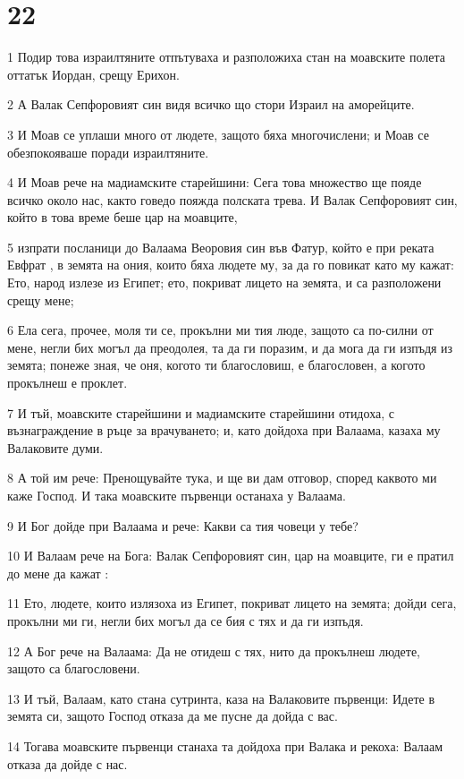 \chapter{22}

\par 1 Подир това израилтяните отпътуваха и разположиха стан на моавските полета оттатък Иордан, срещу Ерихон.
\par 2 А Валак Сепфоровият син видя всичко що стори Израил на аморейците.
\par 3 И Моав се уплаши много от людете, защото бяха многочислени; и Моав се обезпокояваше поради израилтяните.
\par 4 И Моав рече на мадиамските старейшини: Сега това множество ще пояде всичко около нас, както говедо пояжда полската трева. И Валак Сепфоровият син, който в това време беше цар на моавците,
\par 5 изпрати посланици до Валаама Веоровия син във Фатур, който е при реката Евфрат , в земята на ония, които бяха людете му, за да го повикат като му кажат: Ето, народ излезе из Египет; ето, покриват лицето на земята, и са разположени срещу мене;
\par 6 Ела сега, прочее, моля ти се, прокълни ми тия люде, защото са по-силни от мене, негли бих могъл да преодолея, та да ги поразим, и да мога да ги изпъдя из земята; понеже зная, че оня, когото ти благословиш, е благословен, а когото прокълнеш е проклет.
\par 7 И тъй, моавските старейшини и мадиамските старейшини отидоха, с възнаграждение в ръце за врачуването; и, като дойдоха при Валаама, казаха му Валаковите думи.
\par 8 А той им рече: Пренощувайте тука, и ще ви дам отговор, според каквото ми каже Господ. И така моавските първенци останаха у Валаама.
\par 9 И Бог дойде при Валаама и рече: Какви са тия човеци у тебе?
\par 10 И Валаам рече на Бога: Валак Сепфоровият син, цар на моавците, ги е пратил до мене да кажат :
\par 11 Ето, людете, които излязоха из Египет, покриват лицето на земята; дойди сега, прокълни ми ги, негли бих могъл да се бия с тях и да ги изпъдя.
\par 12 А Бог рече на Валаама: Да не отидеш с тях, нито да прокълнеш людете, защото са благословени.
\par 13 И тъй, Валаам, като стана сутринта, каза на Валаковите първенци: Идете в земята си, защото Господ отказа да ме пусне да дойда с вас.
\par 14 Тогава моавските първенци станаха та дойдоха при Валака и рекоха: Валаам отказа да дойде с нас.
